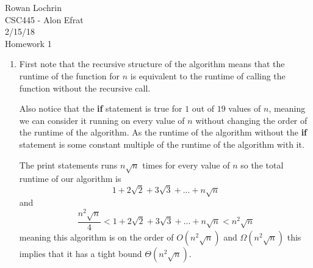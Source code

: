 \documentclass[11pt]{article}
\begin{document}
\begin{flushleft}
	Rowan Lochrin \\
	CSC445 - Alon Efrat\\
	2/15/18 \\
	Homework 1
\end{flushleft}
\begin{enumerate}
	\item First note that the recursive structure of the algorithm means that
		the runtime of the function for $n$ is equivalent to the runtime
		of calling the function without the recursive call.
			
		Also notice that the \textbf{if} statement is true for $1$ out of $19$ values of
		$n$, meaning we can consider it running on every value of $n$
		without changing the order of the runtime of the algorithm. As
		the runtime of the algorithm without the \textbf{if} statement is some
		constant multiple of the runtime of the algorithm with it.

		The print statements runs $n \sqrt n$ times for every value of
		$n$ so the total runtime of our algorithm is
		$$1 + 2 \sqrt 2 + 3 \sqrt 3 + ... + n \sqrt n$$
		and
		$$ \frac{n^2 \sqrt n  }{4} < 1+ 2 \sqrt 2 + 3 \sqrt 3 + ... + n \sqrt n
		<  n^2 \sqrt n $$
		meaning this algorithm is on the order of $O(n^2\sqrt n)$ and
		$\Omega(n^2 \sqrt n)$ this implies that it has a tight bound
		$\Theta(n^2\sqrt n)$.
		

\end{enumerate}
\end{document}
